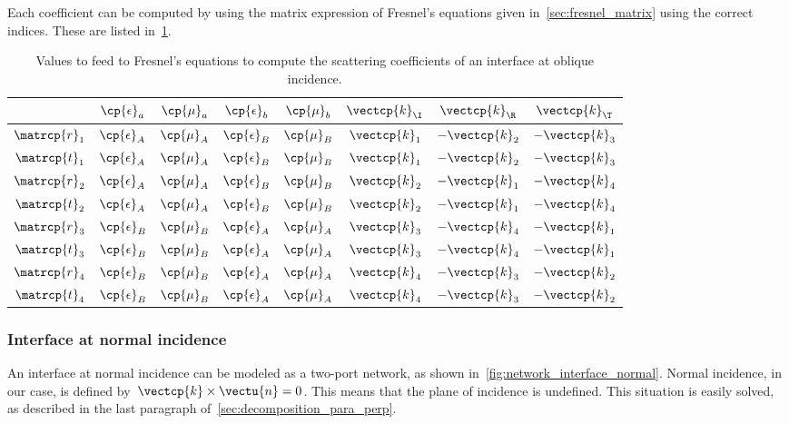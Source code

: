 Each coefficient can be computed by using the matrix expression of Fresnel's equations given in~\cref{sec:fresnel_matrix} using the correct indices.
These are listed in~\cref{tab:fresnel_implementation_indices}.
\begin{table}[hbtp]
    \centering
    \begin{tabular}{cccccccc}
        \toprule
                       & $\cp{\epsilon}_a$ & $\cp{\mu}_a$ & $\cp{\epsilon}_b$ & $\cp{\mu}_b$ & $\vectcp{k}_\I$ & $\vectcp{k}_\R$ & $\vectcp{k}_\T$ \\
        \midrule
        $\matrcp{r}_1$ & $\cp{\epsilon}_A$ & $\cp{\mu}_A$ & $\cp{\epsilon}_B$ & $\cp{\mu}_B$ & $\vectcp{k}_1$  & $-\vectcp{k}_2$ & $-\vectcp{k}_3$ \\
        $\matrcp{t}_1$ & $\cp{\epsilon}_A$ & $\cp{\mu}_A$ & $\cp{\epsilon}_B$ & $\cp{\mu}_B$ & $\vectcp{k}_1$  & $-\vectcp{k}_2$ & $-\vectcp{k}_3$ \\
        $\matrcp{r}_2$ & $\cp{\epsilon}_A$ & $\cp{\mu}_A$ & $\cp{\epsilon}_B$ & $\cp{\mu}_B$ & $\vectcp{k}_2$  & $-\vectcp{k}_1$ & $-\vectcp{k}_4$ \\
        $\matrcp{t}_2$ & $\cp{\epsilon}_A$ & $\cp{\mu}_A$ & $\cp{\epsilon}_B$ & $\cp{\mu}_B$ & $\vectcp{k}_2$  & $-\vectcp{k}_1$ & $-\vectcp{k}_4$ \\
        $\matrcp{r}_3$ & $\cp{\epsilon}_B$ & $\cp{\mu}_B$ & $\cp{\epsilon}_A$ & $\cp{\mu}_A$ & $\vectcp{k}_3$  & $-\vectcp{k}_4$ & $-\vectcp{k}_1$ \\
        $\matrcp{t}_3$ & $\cp{\epsilon}_B$ & $\cp{\mu}_B$ & $\cp{\epsilon}_A$ & $\cp{\mu}_A$ & $\vectcp{k}_3$  & $-\vectcp{k}_4$ & $-\vectcp{k}_1$ \\
        $\matrcp{r}_4$ & $\cp{\epsilon}_B$ & $\cp{\mu}_B$ & $\cp{\epsilon}_A$ & $\cp{\mu}_A$ & $\vectcp{k}_4$  & $-\vectcp{k}_3$ & $-\vectcp{k}_2$ \\
        $\matrcp{t}_4$ & $\cp{\epsilon}_B$ & $\cp{\mu}_B$ & $\cp{\epsilon}_A$ & $\cp{\mu}_A$ & $\vectcp{k}_4$  & $-\vectcp{k}_3$ & $-\vectcp{k}_2$ \\
        \bottomrule
    \end{tabular}
    \caption{
        Values to feed to Fresnel's equations to compute the scattering coefficients
        of an interface at oblique incidence.
    }
    \label{tab:fresnel_implementation_indices}
\end{table}


\subsubsection{Interface at normal incidence}
\label{sec:interface_normal_incidence}
An interface at normal incidence can be modeled as a two-port network,
as shown in~\cref{fig:network_interface_normal}.
Normal incidence, in our case, is defined by~$\vectcp{k} \times \vectu{n} = 0$.
This means that the plane of incidence is undefined.
This situation is easily solved, as described in the last paragraph of~\cref{sec:decomposition_para_perp}.

